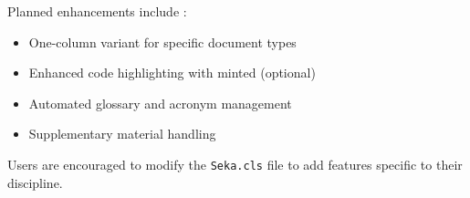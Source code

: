 Planned enhancements include \cite{futurework2025}:

\begin{itemize}
    \item One-column variant for specific document types
    \item Enhanced code highlighting with minted (optional)
    \item Automated glossary and acronym management
    \item Supplementary material handling
\end{itemize}

\begin{important}
Users are encouraged to modify the \texttt{Seka.cls} file to add features specific to their discipline.
\end{important}